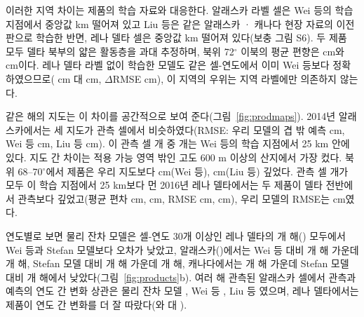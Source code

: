 이러한 지역 차이는 제품의 학습 자료와 대응한다. 알래스카 라벨 셀은 Wei 등의 학습 지점에서 중앙값 \ndistweiAkmed{} km 떨어져 있고 Liu 등은 같은 알래스카 · 캐나다 현장 자료의 이전 판으로 학습한 반면, 레나 델타 셀은 중앙값 \ndistweiLemed{} km 떨어져 있다(보충 그림 S6). 두 제품 모두 델타 북부의 얇은 활동층을 과대 추정하며, 북위 72$^\circ$ 이북의 평균 편향은 \nbiasLeNorthWei{} cm와 \nbiasLeNorthLiu{} cm이다. 레나 델타 라벨 없이 학습한 모델도 같은 셀-연도에서 이미 Wei 등보다 정확하였으므로(\ntlvprmseLeRsWeizero{} cm 대 \ntlvprmseLeWeizero{} cm, $\Delta$RMSE \ntlvpLeRsWeizero{} cm), 이 지역의 우위는 지역 라벨에만 의존하지 않는다.

같은 해의 지도는 이 차이를 공간적으로 보여 준다(그림~\ref{fig:prodmaps}). 2014년 알래스카에서는 세 지도가 관측 셀에서 비슷하였다(RMSE: 우리 모델의 겹 밖 예측 \nfeAkOof{} cm, Wei 등 \nfeAkWei{} cm, Liu 등 \nfeAkLiu{} cm). 이 관측 셀 \nfeAkN{}개 중 \nfeAkNearWei{}개는 Wei 등의 학습 지점에서 25 km 안에 있다. 지도 간 차이는 적용 가능 영역 밖인 고도 600 m 이상의 산지에서 가장 컸다. 북위 68--70$^\circ$에서 제품은 우리 지도보다 \nmapAkFootMtnWei{} cm(Wei 등), \nmapAkFootMtnLiu{} cm(Liu 등) 깊었다. 관측 셀 \nfeLeN{}개가 모두 이 학습 지점에서 25 km보다 먼 2016년 레나 델타에서는 두 제품이 델타 전반에서 관측보다 깊었고(평균 편차 \nfeLeBiasWei{} cm, \nfeLeBiasLiu{} cm, RMSE \nfeLeWei{} cm, \nfeLeLiu{} cm), 우리 모델의 RMSE는 \nfeLeOof{} cm였다.


연도별로 보면 물리 잔차 모델은 셀-연도 30개 이상인 레나 델타의 \nywLen{}개 해(\nyrsywLeko) 모두에서 Wei 등과 Stefan 모델보다 오차가 낮았고, 알래스카(\nyrsywAkko)에서는 Wei 등 대비 \nywAkRoWein{}개 해 가운데 \nywAkRoWeiwin{}개 해, Stefan 모델 대비 \nywAkRoPon{}개 해 가운데 \nywAkRoPowin{}개 해, 캐나다에서는 \nywCaRoPon{}개 해 가운데 Stefan 모델 대비 \nywCaRoPowin{}개 해에서 낮았다(그림~\ref{fig:products}b). 여러 해 관측된 알래스카 셀에서 관측과 예측의 연도 간 변화 상관은 물리 잔차 모델 \nrdeltaAkRo, Wei 등 \nrdeltaAkWei, Liu 등 \nrdeltaAkLiu{}였으며, 레나 델타에서는 제품이 연도 간 변화를 더 잘 따랐다(\nrdeltaLeWei{}와 \nrdeltaLeLiu{} 대 \nrdeltaLeRo).

